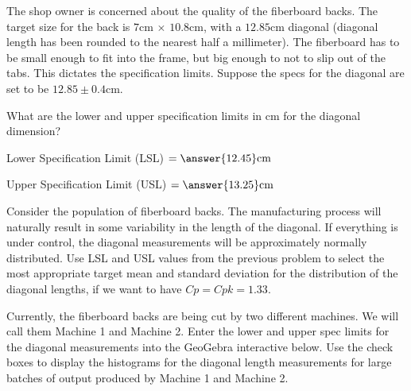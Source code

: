 \documentclass{ximera}
\begin{document}
The shop owner is concerned about the quality of the fiberboard backs.  The target size for the back is $7$cm $\times$ $10.8$cm, with a $12.85$cm diagonal (diagonal length has been rounded to the nearest half a millimeter).  The fiberboard has to be small enough to fit into the frame, but big enough to not to slip out of the tabs.  This dictates the specification limits.  Suppose the specs for the diagonal are set to be $12.85\pm 0.4$cm.

\begin{question}\label{quest:qc150_1}
What are the lower and upper specification limits in cm for the diagonal dimension?

Lower Specification Limit (LSL) $=\answer{12.45}\text{cm}$

Upper Specification Limit (USL) $=\answer{13.25}\text{cm}$

\end{question}

\begin{question}\label{quest:qc150_2}
    Consider the population of fiberboard backs.  The manufacturing process will naturally result in some variability in the length of the diagonal.  If everything is under control, the diagonal measurements will be approximately normally distributed.  Use LSL and USL values from the previous problem to select the most appropriate target mean and standard deviation for the distribution of the diagonal lengths, if we want to have $Cp=Cpk=1.33$.

    \begin{multipleChoice}
    \end{multipleChoice}
\end{question}

Currently, the fiberboard backs are being cut by two different machines.  We will call them Machine 1 and Machine 2.
Enter the lower and upper spec limits for the diagonal measurements into the GeoGebra interactive below.  Use the check boxes to display the histograms for the diagonal length measurements for large batches of output produced by Machine 1 and Machine 2. 

\begin{onlineOnly}
\begin{center} 
\end{center}
\end{onlineOnly}
\end{document}
